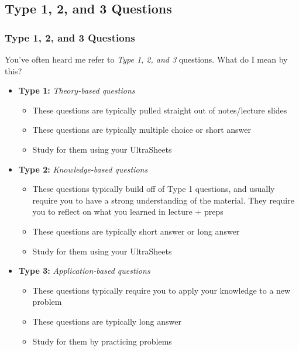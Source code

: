 \documentclass[hyperref={colorlinks,citecolor=blue,linkcolor=blue,urlcolor=blue}, aspectratio=1610]{beamer}
\begin{document}
\subsection{Type 1, 2, and 3 Questions}
\begin{frame}
  \frametitle{Type 1, 2, and 3 Questions}
  You've often heard me refer to \textit{Type 1, 2, and 3} questions. What do I mean by this? \\ \pause
  \begin{itemize}
    \item \textbf{Type 1:} \textit{Theory-based questions}
    \begin{itemize}
      \item These questions are typically pulled straight out of notes/lecture slides
      \item These questions are typically multiple choice or short answer
      \item Study for them using your UltraSheets\texttrademark{}
    \end{itemize}
    \pause 
    \item \textbf{Type 2:} \textit{Knowledge-based questions}
    \begin{itemize}
      \item These questions typically build off of Type 1 questions, and usually require you to have a strong understanding of the material. They require you to reflect on what you learned in lecture + preps
      \item These questions are typically short answer or long answer
      \item Study for them using your UltraSheets\texttrademark{}
    \end{itemize}
    \pause
    \item \textbf{Type 3:} \textit{Application-based questions}
    \begin{itemize}
      \item These questions typically require you to apply your knowledge to a new problem
      \item These questions are typically long answer
      \item Study for them by practicing problems
    \end{itemize}
  \end{itemize}
\end{frame}
\end{document}
